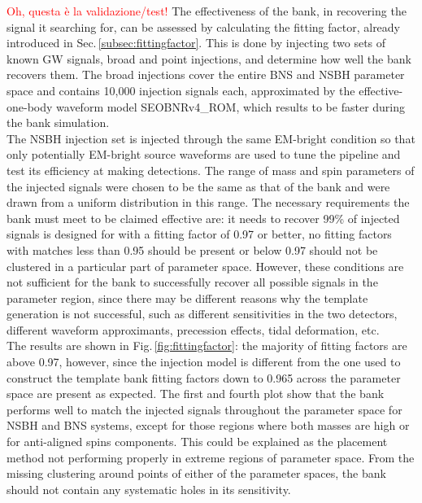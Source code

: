 \documentclass[binding=0.6cm, LaM]{sapthesis}
\newcommand{\fpg}[1]{\textcolor{red}{#1} }
\begin{document}
                \fpg{Oh, questa \`e la validazione/test!}
	The effectiveness of the bank, in recovering the signal it searching for,
        can be assessed by calculating the fitting factor,
        already introduced in Sec.\,\ref{subsec:fittingfactor}.
        This is done by injecting two sets of known GW signals, broad and point injections,
        and determine how well the bank recovers them.
	The broad injections cover the entire BNS and NSBH parameter space and contains 10,000 injection signals each,
	approximated by the effective-one-body waveform model SEOBNRv4\_ROM, 
	which results to be faster during the bank simulation.\\
	The NSBH injection set is injected  through the same EM-bright condition so that
	only potentially EM-bright source waveforms are used to tune the pipeline and test its efficiency at making detections.
	The range of mass and spin parameters of the injected signals were chosen 
	to be the same as that of the bank and were drawn from a uniform distribution in this range. 
	The necessary requirements the bank must meet to be claimed effective are: 
	it needs to recover 99\% of injected signals is designed for with a fitting factor of 0.97 or better,
	no fitting factors with matches less than 0.95 should be present or 
	below 0.97 should not be clustered in a particular part of parameter space. 
	However, these conditions are not sufficient for the bank to  successfully recover all possible signals in the parameter region,
	since there may be different reasons why the template generation is not successful, such as different sensitivities in the two detectors, 	
	different waveform approximants, precession effects, tidal deformation, etc.\\
	The results are shown in Fig.\,\ref{fig:fittingfactor}: 
	the majority of fitting factors are above 0.97, 
	however, since the injection model is different from the one used to construct the template bank
	fitting factors down to 0.965 across the parameter space are present as expected.
	The first and fourth plot show that the bank performs well to match the injected signals 
	throughout the parameter space for NSBH and BNS systems, 
	except for those regions where both masses are high or for anti-aligned spins components.
	This could be explained as the placement method not performing properly in extreme regions of parameter space.
	From the missing clustering around points of either of the parameter spaces,
	the bank should not contain any systematic holes in its sensitivity.
\end{document}
